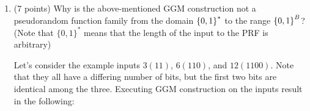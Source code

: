 \documentclass[11pt]{article}
\begin{document}
\begin{enumerate}
  \begin{enumerate}
   \item (7 points) Why is the above-mentioned GGM construction not a pseudorandom function family from the domain $\zo^*$ to the range $\zo^B$? (Note that $\{0,1\}^{*}$ means that the length of the input to the PRF is arbitrary) \newline 
    {\bfseries

      Let's consider the example inputs $3 (11)$, $6 (110)$, and $12 (1100)$. Note that they all have a differing number of bits, but the first two bits are identical among the three. Executing GGM construction on the inputs result in the following: \newline





\begin{tikzpicture}[x=0.75pt,y=0.75pt,yscale=-1,xscale=1]


\end{tikzpicture}}
\end{enumerate}
\end{enumerate}
\end{document}
